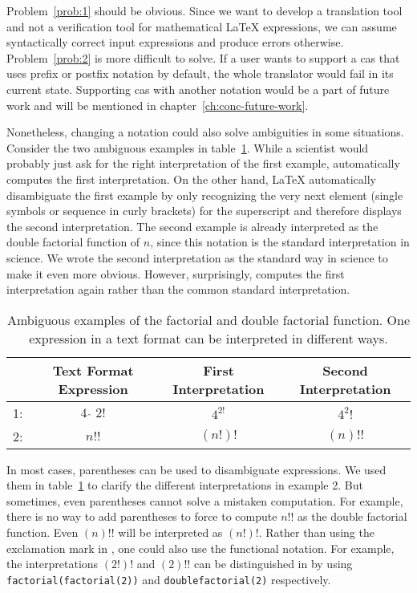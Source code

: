 Problem~\ref{prob:1} should be obvious. Since we want to develop a translation tool and not a verification tool for mathematical \LaTeX{} expressions, we can assume syntactically correct input expressions and produce errors otherwise. Problem~\ref{prob:2} is more difficult to solve. If a user wants to support a \gls{cas} that uses prefix or postfix notation by default, the whole translator would fail in its current state. Supporting \gls{cas} with another notation would be a part of future work and will be mentioned in chapter~\ref{ch:conc-future-work}.

Nonetheless, changing a notation could also solve ambiguities in some situations. Consider the two ambiguous examples in table~\ref{tab:amb_ex}. While a scientist would probably just ask for the right interpretation of the first example, \Maple{} automatically computes the first interpretation. On the other hand, \LaTeX{} automatically disambiguate the first example by only recognizing the very next element (single symbols or sequence in curly brackets) for the superscript and therefore displays the second interpretation. The second example is already interpreted as the double factorial function of $n$, since this notation is the standard interpretation in science. We wrote the second interpretation as the standard way in science to make it even more obvious. However, surprisingly, \Maple{} computes the first interpretation again rather than the common standard interpretation.
\begin{table}[ht]
\centering
\begin{tabular}{lccc}
	\hline
	& Text Format Expression & First Interpretation & Second Interpretation\\
	\hline
	1: & \rule{0pt}{0.9\normalbaselineskip} $4\ \hat{\ }\ 2!$ & $4^{2!}$ & $4^2!$ \\
	2: & $n!!$ & $(n!)!$ & $(n)!!$\\
	\hline
\end{tabular}
\caption{Ambiguous examples of the factorial and double factorial function. One expression in a text format can be interpreted in different ways.}
\label{tab:amb_ex}
\end{table}

In most cases, parentheses can be used to disambiguate expressions. We used them in table~\ref{tab:amb_ex} to clarify the different interpretations in example 2. But sometimes, even parentheses cannot solve a mistaken computation. For example, there is no way to add parentheses to force \Maple{} to compute $n!!$ as the double factorial function. Even $(n)!!$ will be interpreted as $(n!)!$. Rather than using the exclamation mark in \Maple, one could also use the functional notation. For example, the interpretations $(2!)!$ and $(2)!!$ can be distinguished in \Maple{} by using \verb|factorial(factorial(2))| and \verb|doublefactorial(2)| respectively.

